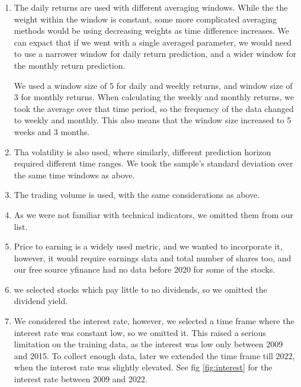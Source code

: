 \documentclass{article}
\begin{document}
\begin{enumerate}
    \item The daily returns are used with different
          averaging windows. While the the weight within the
          window is constant, some more complicated averaging
          methods would be using decreasing weights as time
          difference increases. We can expact that if we went
          with a single averaged parameter, we would need to use
          a narrower window for daily return prediction,
          and a wider window for the monthly return prediction.

          We used a window size of 5 for daily and weekly returns,
          and window size of 3 for monthly returns. When calculating
          the weekly and monthly returns, we took the average over
          that time period, so the frequency of the data changed
          to weekly and monthly. This also means that the window size
          increased to 5 weeks and 3 months.
    \item Tha volatility is also used, where similarly,
          different prediction horizon required different
          time ranges. We took the sample's standard deviation
          over the same time windows as above.
    \item The trading volume is used, with the same
          considerations as above.
    \item As we were not familiar with technical indicators,
          we omitted them from our list.
    \item Price to earning is a widely used metric,
          and we wanted to incorporate it, however,
          it would require earnings data and total number of shares too,
          and our free source yfinance had no data before 2020 for some
          of the stocks.
    \item we selected stocks which pay little to no dividends,
          so we omitted the dividend yield.
    \item We considered the interest rate, however,
          we selected a time frame where the interest rate
          was constant low, so we omitted it.
          This raised a serious limitation on the training
          data, as the interest was low only between 2009 and 2015.
          To collect enough data, later we extended the time frame
          till 2022, when the interest rate was slightly elevated.
          See fig \ref{fig:interest} for the interest rate
          between 2009 and 2022.

\end{enumerate}
\end{document}
